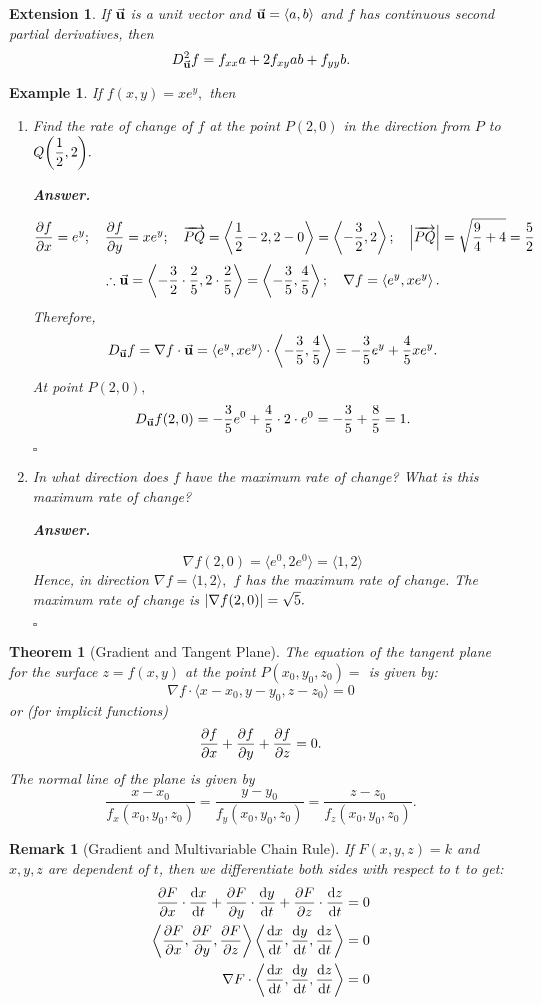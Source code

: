 \documentclass[12pt,a4paper]{article}
\newtheorem{thm}{Theorem}[subsection]
\newtheorem{eg}{Example}[subsection]
\newenvironment*{ans}{\par\indent\textbf{\textit{Answer. }}\par}{\par\hfill{$\square$}\par}
\newtheorem*{rmk}{\indent Remark}
\newtheorem*{ext}{\indent Extension}
\def\vecu{\va{u}}
\begin{document}
\begin{ext}
	If $\vecu$ is a unit vector and $\vecu=\langle a,b\rangle$ and $f$ has continuous second partial derivatives, then \[D_{\vecu}^2f=f_{xx}a+2f_{xy}ab+f_{yy}b.\]	
\end{ext}
\begin{eg}
	If $f(x,y)=xe^y,$ then
	\begin{enumerate}
		\item Find the rate of change of $f$ at the point $P(2,0)$ in the direction from $P$ to $Q\qty(\dfrac{1}{2},2).$
		\begin{ans}
			\[\pdv{f}{x}=e^y;\quad\pdv{f}{y}=xe^y;\quad\overrightarrow{PQ}=\left\langle\frac{1}{2}-2,2-0\right\rangle=\left\langle-\frac{3}{2},2\right\rangle;\quad\qty|\overrightarrow{PQ}|=\sqrt{\frac{9}{4}+4}=\frac{5}{2}\]\[\therefore\vecu=\left\langle-\frac{3}{2}\cdot\frac{2}{5},2\cdot\frac{2}{5}\right\rangle=\left\langle-\frac{3}{5},\frac{4}{5}\right\rangle;\quad\nabla f=\left\langle e^y,xe^y\right\rangle.\]Therefore, \[D_{\vecu}f=\nabla f\cdot\vecu=\left\langle e^y,xe^y\right\rangle\cdot\left\langle-\frac{3}{5},\frac{4}{5}\right\rangle=-\frac{3}{5}e^y+\frac{4}{5}xe^y.\] At point $P(2,0),$ \[D_{\vecu}f(2,0)=-\frac{3}{5}e^0+\frac{4}{5}\cdot2\cdot e^0=-\frac{3}{5}+\frac{8}{5}=1.\]
		\end{ans}
		\item In what direction does $f$ have the maximum rate of change? What is this maximum rate of change?
		\begin{ans}
			\[\nabla f(2,0)=\langle e^0,2e^0\rangle=\langle1,2\rangle\] Hence, in direction $\nabla f=\langle1,2\rangle,$ $f$ has the maximum rate of change. The maximum rate of change is $\qty|\nabla f(2,0)|=\sqrt{5}.$
		\end{ans}
	\end{enumerate}
\end{eg}
\begin{thm}[Gradient and Tangent Plane]
	The equation of the tangent plane for the surface $z=f(x,y)$ at the point $P(x_0,y_0,z_0) =$ is given by: \[\nabla f\cdot\langle x-x_0,y-y_0,z-z_0\rangle=0\] or (for implicit functions) \[\pdv{f}{x} (x-x_0)+\pdv{f}{y} (y-y_0)+\pdv{f}{z} (z-z_0)=0.\]	The normal line of the plane is given by \[\frac{x-x_0}{f_x(x_0,y_0,z_0)}=\frac{y-y_0}{f_y(x_0,y_0,z_0)}=\frac{z-z_0}{f_z(x_0,y_0,z_0)}.\]
\end{thm}
\begin{rmk}[Gradient and Multivariable Chain Rule]
	If $F(x,y,z)=k$ and $x,y,z$ are dependent of $t$, then we differentiate both sides with respect to $t$ to get:\[\begin{aligned}\pdv{F}{x}\cdot\dv{x}{t}+\pdv{F}{y}\cdot\dv{y}{t}+\pdv{F}{z}\cdot\dv{z}{t}&=0\\\left\langle\pdv{F}{x},\pdv{F}{y},\pdv{F}{z}\right\rangle\left\langle\dv{x}{t},\dv{y}{t},\dv{z}{t}\right\rangle&=0\\\nabla F\cdot\left\langle\dv{x}{t},\dv{y}{t},\dv{z}{t}\right\rangle&=0\end{aligned}\]	
\end{rmk}
\end{document}

